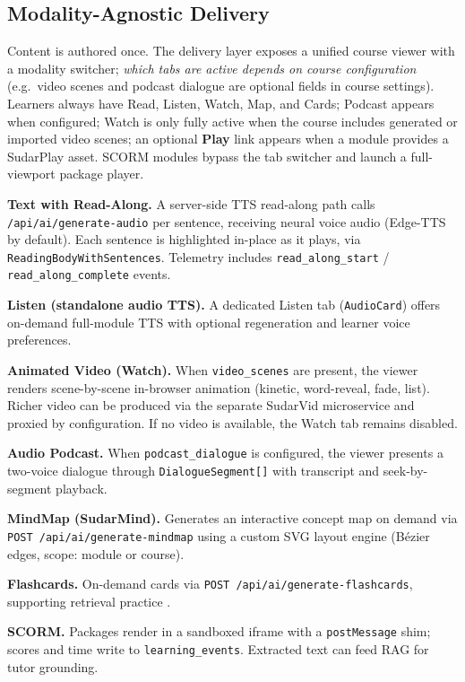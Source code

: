\documentclass[10pt,twocolumn]{article}
\begin{document}
\subsection{Modality-Agnostic Delivery}
\label{sec:modality}

Content is authored once. The delivery layer exposes a unified course
viewer with a modality switcher; \emph{which tabs are active depends
on course configuration} (e.g.\ video scenes and podcast dialogue are
optional fields in course settings). Learners always have Read, Listen,
Watch, Map, and Cards; Podcast appears when configured; Watch is only
fully active when the course includes generated or imported video
scenes; an optional \textbf{Play} link appears when a module provides a
SudarPlay asset. SCORM modules bypass the tab switcher and launch a
full-viewport package player.

\textbf{Text with Read-Along.} A server-side TTS read-along path
calls \texttt{/api/ai/generate-audio} per sentence, receiving neural
voice audio (Edge-TTS by default). Each sentence is highlighted in-place
as it plays, via \texttt{ReadingBodyWithSentences}. Telemetry includes
\texttt{read\_along\_start} / \texttt{read\_along\_complete} events.

\textbf{Listen (standalone audio TTS).} A dedicated Listen tab
(\texttt{AudioCard}) offers on-demand full-module TTS with optional
regeneration and learner voice preferences.

\textbf{Animated Video (Watch).} When \texttt{video\_scenes} are present,
the viewer renders scene-by-scene in-browser animation (kinetic,
word-reveal, fade, list). Richer video can be produced via the separate
SudarVid microservice and proxied by configuration. If no video is
available, the Watch tab remains disabled.

\textbf{Audio Podcast.} When \texttt{podcast\_dialogue} is configured,
the viewer presents a two-voice dialogue through \texttt{DialogueSegment[]}
with transcript and seek-by-segment playback.

\textbf{MindMap (SudarMind).} Generates an interactive concept map
on demand via \texttt{POST /api/ai/generate-mindmap} using a custom SVG
layout engine (B\'{e}zier edges, scope: module or course).

\textbf{Flashcards.} On-demand cards via \texttt{POST /api/ai/generate-flashcards},
supporting retrieval practice \cite{roediger2006,black1998}.

\textbf{SCORM.} Packages render in a sandboxed iframe with a
\texttt{postMessage} shim; scores and time write to
\texttt{learning\_events}. Extracted text can feed RAG for tutor
grounding.
\end{document}
